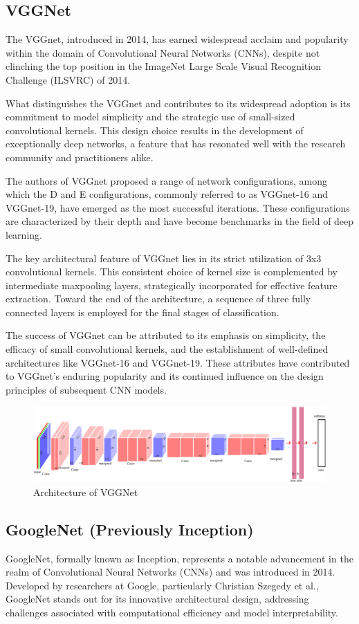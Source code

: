 \documentclass{report}
\begin{document}
\subsection{VGGNet}
The VGGnet, introduced in 2014, has earned widespread acclaim and popularity within the domain of Convolutional Neural Networks (CNNs), despite not clinching the top position in the ImageNet Large Scale Visual Recognition Challenge (ILSVRC) of 2014.

What distinguishes the VGGnet and contributes to its widespread adoption is its commitment to model simplicity and the strategic use of small-sized convolutional kernels. This design choice results in the development of exceptionally deep networks, a feature that has resonated well with the research community and practitioners alike.

The authors of VGGnet proposed a range of network configurations, among which the D and E configurations, commonly referred to as VGGnet-16 and VGGnet-19, have emerged as the most successful iterations. These configurations are characterized by their depth and have become benchmarks in the field of deep learning.

The key architectural feature of VGGnet lies in its strict utilization of 3x3 convolutional kernels. This consistent choice of kernel size is complemented by intermediate maxpooling layers, strategically incorporated for effective feature extraction. Toward the end of the architecture, a sequence of three fully connected layers is employed for the final stages of classification.

The success of VGGnet can be attributed to its emphasis on simplicity, the efficacy of small convolutional kernels, and the establishment of well-defined architectures like VGGnet-16 and VGGnet-19. These attributes have contributed to VGGnet's enduring popularity and its continued influence on the design principles of subsequent CNN models.
\begin{figure}[ht]
	\includegraphics[width=350pt]{51}
	\centering
	\caption{Architecture of VGGNet}
\end{figure}

\subsection{GoogleNet (Previously Inception)}
GoogleNet, formally known as Inception, represents a notable advancement in the realm of Convolutional Neural Networks (CNNs) and was introduced in 2014. Developed by researchers at Google, particularly Christian Szegedy et al., GoogleNet stands out for its innovative architectural design, addressing challenges associated with computational efficiency and model interpretability.
\end{document}
